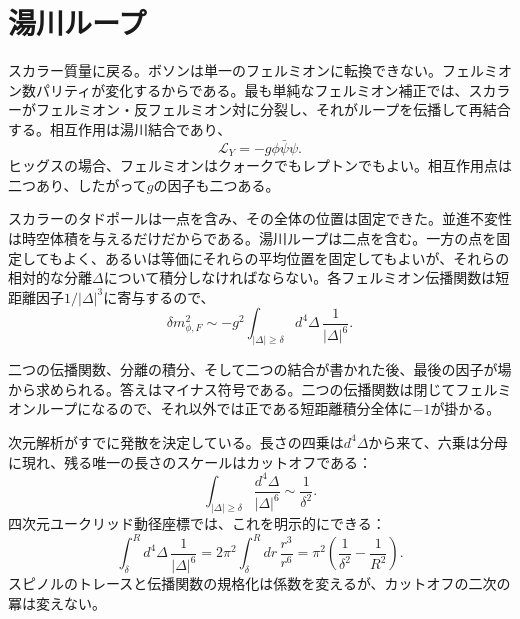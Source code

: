 \section{湯川ループ}

スカラー質量に戻る。ボソンは単一のフェルミオンに転換できない。フェルミオン数パリティが変化するからである。最も単純なフェルミオン補正では、スカラーがフェルミオン・反フェルミオン対に分裂し、それがループを伝播して再結合する。相互作用は湯川結合であり、
\begin{equation}
\mathcal L_Y=-g\phi\bar\psi\psi.
\end{equation}
ヒッグスの場合、フェルミオンはクォークでもレプトンでもよい。相互作用点は二つあり、したがって\(g\)の因子も二つある。

スカラーのタドポールは一点を含み、その全体の位置は固定できた。並進不変性は時空体積を与えるだけだからである。湯川ループは二点を含む。一方の点を固定してもよく、あるいは等価にそれらの平均位置を固定してもよいが、それらの相対的な分離\(\Delta\)について積分しなければならない。各フェルミオン伝播関数は短距離因子\(1/|\Delta|^3\)に寄与するので、
\begin{equation}
\delta m_{\phi,F}^2
\sim
-g^2\int_{|\Delta|\geq\delta}d^4\Delta\,
\frac{1}{|\Delta|^6}.
\end{equation}

二つの伝播関数、分離の積分、そして二つの結合が書かれた後、最後の因子が場から求められる。答えはマイナス符号である。二つの伝播関数は閉じてフェルミオンループになるので、それ以外では正である短距離積分全体に\(-1\)が掛かる。

次元解析がすでに発散を決定している。長さの四乗は\(d^4\Delta\)から来て、六乗は分母に現れ、残る唯一の長さのスケールはカットオフである：
\begin{equation}
\int_{|\Delta|\geq\delta}
\frac{d^4\Delta}{|\Delta|^6}
\sim\frac{1}{\delta^2}.
\end{equation}
四次元ユークリッド動径座標では、これを明示的にできる：
\begin{equation}
\int_{\delta}^{R}d^4\Delta\,\frac{1}{|\Delta|^6}
=2\pi^2\int_{\delta}^{R}dr\,\frac{r^3}{r^6}
=\pi^2\left(\frac{1}{\delta^2}-\frac{1}{R^2}\right).
\end{equation}
スピノルのトレースと伝播関数の規格化は係数を変えるが、カットオフの二次の冪は変えない。

\begin{classroomqa}
\end{classroomqa}

